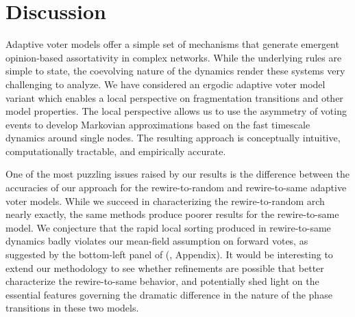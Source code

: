 \documentclass[review, onefignum, onetabnum]{siamart171218}
\begin{document}
\section{Discussion} \label{sec:discussion}

	Adaptive voter models offer a simple set of mechanisms that generate emergent opinion-based assortativity in complex networks. 
	While the underlying rules are simple to state, the coevolving nature of the dynamics render these systems very challenging to analyze. 
	We have considered an ergodic adaptive voter model variant which enables a local perspective on fragmentation transitions and other model properties. 
	The local perspective allows us to use the asymmetry of voting events to develop Markovian approximations based on the fast timescale dynamics around single nodes. 
	The resulting approach is conceptually intuitive, computationally tractable, and empirically accurate. 
	
	One of the most puzzling issues raised by our results is the difference between the accuracies of our approach for the rewire-to-random and rewire-to-same adaptive voter models. 
	While we succeed in characterizing the rewire-to-random arch nearly exactly, the same methods produce poorer results for the rewire-to-same model. 
	We conjecture that the rapid local sorting produced in rewire-to-same dynamics badly violates our mean-field assumption on forward votes, as suggested by the bottom-left panel of  (, Appendix). 
	It would be interesting to extend our methodology to see whether refinements are possible that better characterize the rewire-to-same behavior, and potentially shed light on the essential features governing the dramatic difference in the nature of the phase transitions in these two models. 
		
\end{document}
